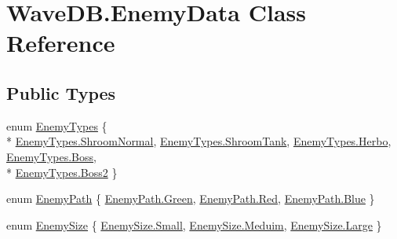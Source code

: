 \hypertarget{class_wave_d_b_1_1_enemy_data}{}\section{Wave\+D\+B.\+Enemy\+Data Class Reference}
\label{class_wave_d_b_1_1_enemy_data}
\subsection*{Public Types}
\begin{DoxyCompactItemize}
\item 
enum \hyperlink{class_wave_d_b_1_1_enemy_data_af2724714b62807d0eadf70f69019be9c}{Enemy\+Types} \{ \\*
\hyperlink{class_wave_d_b_1_1_enemy_data_af2724714b62807d0eadf70f69019be9cafaab7b6fcaeeb75913b470a8de927a1b}{Enemy\+Types.\+Shroom\+Normal}, 
\hyperlink{class_wave_d_b_1_1_enemy_data_af2724714b62807d0eadf70f69019be9caf29fcc4823872bcef5f2f6c15017f942}{Enemy\+Types.\+Shroom\+Tank}, 
\hyperlink{class_wave_d_b_1_1_enemy_data_af2724714b62807d0eadf70f69019be9ca964dc9dd4fa55ce0937d324ac1fc38c1}{Enemy\+Types.\+Herbo}, 
\hyperlink{class_wave_d_b_1_1_enemy_data_af2724714b62807d0eadf70f69019be9ca5859831e2b3db23528c710b1451e13fc}{Enemy\+Types.\+Boss}, 
\\*
\hyperlink{class_wave_d_b_1_1_enemy_data_af2724714b62807d0eadf70f69019be9cade10f3b430025d072affd5ec149f4992}{Enemy\+Types.\+Boss2}
 \}
\item 
enum \hyperlink{class_wave_d_b_1_1_enemy_data_acbefce08e6d5ef766be909fb89eda0ad}{Enemy\+Path} \{ \hyperlink{class_wave_d_b_1_1_enemy_data_acbefce08e6d5ef766be909fb89eda0adad382816a3cbeed082c9e216e7392eed1}{Enemy\+Path.\+Green}, 
\hyperlink{class_wave_d_b_1_1_enemy_data_acbefce08e6d5ef766be909fb89eda0adaee38e4d5dd68c4e440825018d549cb47}{Enemy\+Path.\+Red}, 
\hyperlink{class_wave_d_b_1_1_enemy_data_acbefce08e6d5ef766be909fb89eda0ada9594eec95be70e7b1710f730fdda33d9}{Enemy\+Path.\+Blue}
 \}
\item 
enum \hyperlink{class_wave_d_b_1_1_enemy_data_a2c2210697722767dae7b117370470742}{Enemy\+Size} \{ \hyperlink{class_wave_d_b_1_1_enemy_data_a2c2210697722767dae7b117370470742a2660064e68655415da2628c2ae2f7592}{Enemy\+Size.\+Small}, 
\hyperlink{class_wave_d_b_1_1_enemy_data_a2c2210697722767dae7b117370470742aac541523cb9728cf77611723ca19eb98}{Enemy\+Size.\+Meduim}, 
\hyperlink{class_wave_d_b_1_1_enemy_data_a2c2210697722767dae7b117370470742a3a69b34ce86dacb205936a8094f6c743}{Enemy\+Size.\+Large}
 \}
\end{DoxyCompactItemize}
